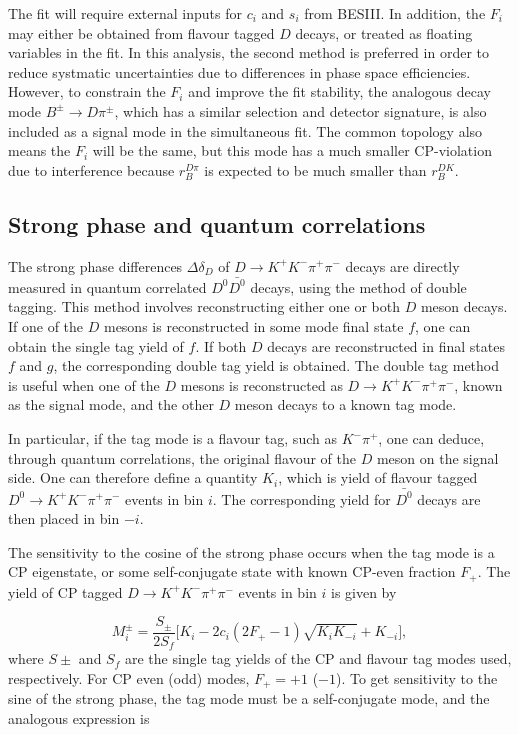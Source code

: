 \documentclass[12pt, a4paper, notitlepage, onecolumn]{article}
\numberwithin{equation}{section}
\begin{document}
The fit will require external inputs for $c_i$ and $s_i$ from BESIII. In addition, the $F_i$ may either be obtained from flavour tagged $D$ decays, or treated as floating variables in the fit. In this analysis, the second method is preferred in order to reduce systmatic uncertainties due to differences in phase space efficiencies. However, to constrain the $F_i$ and improve the fit stability, the analogous decay mode $B^\pm\to D\pi^\pm$, which has a similar selection and detector signature, is also included as a signal mode in the simultaneous fit. The common topology also means the $F_i$ will be the same, but this mode has a much smaller CP-violation due to interference because $r_B^{D\pi}$ is expected to be much smaller than $r_B^{DK}$.

\subsection{Strong phase and quantum correlations}
The strong phase differences $\Delta\delta_D$ of $D\to K^+K^-\pi^+\pi^-$ decays are directly measured in quantum correlated $D^0\bar{D^0}$ decays, using the method of double tagging. This method involves reconstructing either one or both $D$ meson decays. If one of the $D$ mesons is reconstructed in some mode final state $f$, one can obtain the single tag yield of $f$. If both $D$ decays are reconstructed in final states $f$ and $g$, the corresponding double tag yield is obtained. The double tag method is useful when one of the $D$ mesons is reconstructed as $D\to K^+K^-\pi^+\pi^-$, known as the signal mode, and the other $D$ meson decays to a known tag mode.

In particular, if the tag mode is a flavour tag, such as $K^-\pi^+$, one can deduce, through quantum correlations, the original flavour of the $D$ meson on the signal side. One can therefore define a quantity $K_i$, which is yield of flavour tagged $D^0\to K^+K^-\pi^+\pi^-$ events in bin $i$. The corresponding yield for $\bar{D^0}$ decays are then placed in bin $-i$.

The sensitivity to the cosine of the strong phase occurs when the tag mode is a CP eigenstate, or some self-conjugate state with known CP-even fraction $F_+$. The yield of CP tagged $D\to K^+K^-\pi^+\pi^-$ events in bin $i$ is given by

\begin{equation}
  M_i^\pm = \frac{S_\pm}{2S_f}\Big[K_i - 2c_i(2F_+ - 1)\sqrt{K_iK_{-i}} + K_{-i}\Big],
\end{equation}
where $S\pm$ and $S_f$ are the single tag yields of the CP and flavour tag modes used, respectively. For CP even (odd) modes, $F_+ = +1$ ($-1$). To get sensitivity to the sine of the strong phase, the tag mode must be a self-conjugate mode, and the analogous expression is
\end{document}
